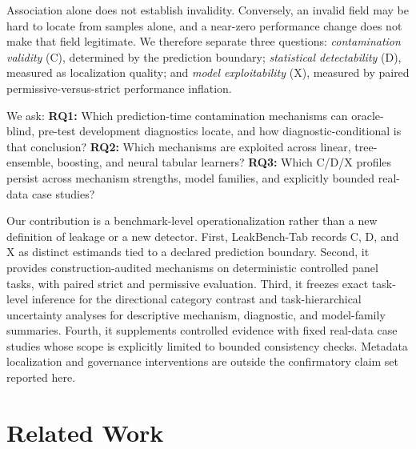 \documentclass[letterpaper]{article}
\begin{document}
Association alone does not establish invalidity.  Conversely, an invalid field
may be hard to locate from samples alone, and a near-zero performance change
does not make that field legitimate.  We therefore separate three questions:
\emph{contamination validity} (C), determined by the prediction boundary;
\emph{statistical detectability} (D), measured as localization quality; and
\emph{model exploitability} (X), measured by paired permissive-versus-strict
performance inflation.

We ask: \textbf{RQ1:} Which prediction-time contamination mechanisms can
oracle-blind, pre-test development diagnostics locate, and how
diagnostic-conditional is that conclusion?  \textbf{RQ2:} Which mechanisms are
exploited across linear, tree-ensemble, boosting, and neural tabular learners?
\textbf{RQ3:} Which C/D/X profiles persist across mechanism strengths, model
families, and explicitly bounded real-data case studies?

Our contribution is a benchmark-level operationalization rather than a new
definition of leakage or a new detector.  First, LeakBench-Tab records C, D, and
X as distinct estimands tied to a declared prediction boundary.  Second, it
provides \LBMechanismCount{} construction-audited mechanisms on
\LBControlledTaskCount{} deterministic controlled panel tasks, with paired
strict and permissive evaluation.  Third, it freezes exact task-level inference
for the directional category contrast and task-hierarchical uncertainty
analyses for descriptive mechanism, diagnostic, and model-family summaries.
Fourth, it supplements
controlled evidence with
\LBNaturalTaskCount{} fixed real-data case studies whose scope is explicitly
limited to bounded consistency checks.  Metadata localization and governance
interventions are outside the confirmatory claim set reported here.

\section{Related Work}
\label{sec:related}
\end{document}
